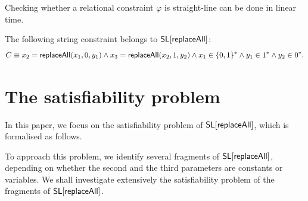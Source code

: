\begin{remark}
Checking whether a relational constraint $\varphi$ is straight-line can be done in linear time. 
\end{remark}


\begin{example}
The following string constraint belongs to $\mathsf{SL}[\mathsf{replaceAll}]$: 
$$C \equiv x_2 = \mathsf{replaceAll}(x_1, 0, y_1) \wedge x_3 = \mathsf{replaceAll}(x_2, 1, y_2) \wedge x_1 \in \{0,1\}^* \wedge y_1 \in 1^* \wedge y_2 \in 0^*.$$
\end{example}




\section{The satisfiability problem} \label{sec-sat}
In this paper, we focus on the satisfiability problem of $\mathsf{SL}[\mathsf{replaceAll}]$, which is formalised as follows. 

\smallskip

\begin{quote} \centering
{}
\end{quote}
\smallskip

To approach this problem, we identify several fragments of  $\mathsf{SL}[\mathsf{replaceAll}]$, depending on whether the second and the third parameters are constants or variables.  We shall investigate extensively the satisfiability problem of the fragments of $\mathsf{SL}[\mathsf{replaceAll}]$. %



